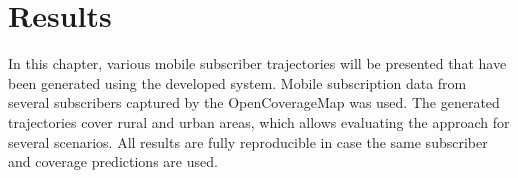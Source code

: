 \documentclass[master,english]{hgbthesis}
\begin{document}
\chapter{Results}
In this chapter, various mobile subscriber trajectories will be presented that have been generated using the developed system. Mobile subscription data from several subscribers captured by the OpenCoverageMap was used. The generated trajectories cover rural and urban areas, which allows evaluating the approach for several scenarios. All results are fully reproducible in case the same subscriber and coverage predictions are used.
\end{document}

